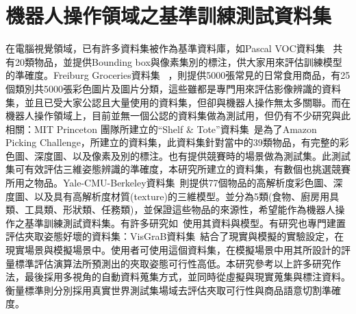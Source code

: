 \section{機器人操作領域之基準訓練測試資料集}
在電腦視覺領域，已有許多資料集被作為基準資料庫，如Pascal VOC資料集 ~\cite{everingham2010pascal}共有20類物品，並提供Bounding box與像素集別的標注，供大家用來評估訓練模型的準確度。Freiburg Groceries資料集 ~\cite{jund2016freiburg}，則提供5000張常見的日常食用商品，有25個類別共5000張彩色圖片及圖片分類，這些雖都是專門用來評估影像辨識的資料集，並且已受大家公認且大量使用的資料集，但卻與機器人操作無太多關聯。而在機器人操作領域上，目前並無一個公認的資料集做為測試用，但仍有不少研究與此相關：MIT Princeton 團隊所建立的``Shelf \& Tote''資料集~\cite{zeng2016multi}是為了Amazon Picking Challenge，所建立的資料集，此資料集針對當中的39類物品，有完整的彩色圖、深度圖、以及像素及別的標注。也有提供競賽時的場景做為測試集。此測試集可有效評估三維姿態辨識的準確度，本研究所建立的資料集，有數個也挑選競賽所用之物品。Yale-CMU-Berkeley資料集~\cite{calli2015benchmarking}則提供77個物品的高解析度彩色圖、深度圖、以及具有高解析度材質(texture)的三維模型。並分為5類(食物、廚房用具類、工具類、形狀類、任務類)，並保證這些物品的來源性，希望能作為機器人操作之基準訓練測試資料集。有許多研究如~\cite{mahler2016dex}使用其資料與模型。有研究也專門建置評估夾取姿態好壞的資料集：VisGraB資料集~\cite{kootstra2012visgrab}結合了現實與模擬的實驗設定，在現實場景與模擬場景中。使用者可使用這個資料集，在模擬場景中用其所設計的評量標準評估演算法所預測出的夾取姿態可行性高低。本研究參考以上許多研究作法，最後採用多視角的自動資料蒐集方式，並同時從虛擬與現實蒐集與標注資料。衡量標準則分別採用真實世界測試集場域去評估夾取可行性與商品語意切割準確度。

